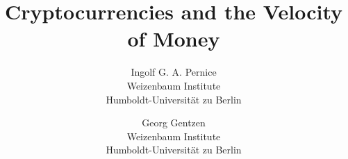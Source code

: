 %
%
% 


\title{\Large \bf Cryptocurrencies and the Velocity of Money}

\author{
	{\rm Ingolf G. A. Pernice}\\
	Weizenbaum Institute\\Humboldt-Universität zu Berlin
	\and
	{\rm Georg Gentzen}\\
	Weizenbaum Institute\\Humboldt-Universität zu Berlin
} %

%
\def \varInputTable {}
\def \varInputFigs  {}

\newcommand{\parRemain}[1]{#1} %

